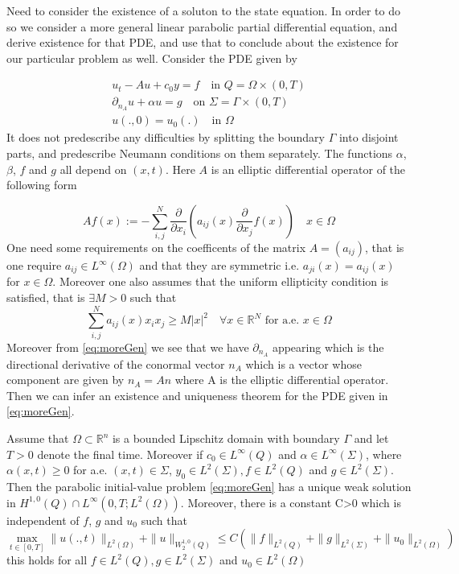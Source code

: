 Need to consider the existence of a soluton to the state equation. In order to do so we consider a more general linear parabolic partial differential equation, and derive existence for that PDE, and use that to conclude about the existence for our particular problem as well. Consider the PDE given by

\begin{align}
    \label{eq:moreGen}
    u_t - Au + c_0 y = f \quad \text{in } Q = \Omega \times (0,T) \\
    \partial_{n_A} u + \alpha u = g \quad \text{on } \Sigma = \Gamma \times (0,T) \\
    u(.,0) = u_0(.) \quad \text{in } \Omega
\end{align}
It does not predescribe any difficulties by splitting the boundary $\Gamma$ into disjoint parts, and predescribe Neumann conditions on them separately. The functions $\alpha$, $\beta$, $f$ and $g$ all depend on $(x,t)$. Here $A$ is an elliptic differential operator of the following form

\begin{equation*}
    Af(x) := -\sum_{i,j}^N\frac{\partial}{\partial x_i}(a_{ij}(x)\frac{\partial}{\partial x_j}f(x)) \quad x\in \Omega
\end{equation*}
One need some requirements on the coefficents of the matrix $A=(a_{ij})$, that is one require $a_{ij} \in L^{\infty}(\Omega)$ and that they are symmetric i.e. $a_{ji}(x) = a_{ij}(x)$ for $x\in \Omega$. Moreover one also assumes that the uniform ellipticity condition is satisfied, that is $\exists M>0$ such that 
\begin{equation*}
    \label{eq:uniformEl}
    \sum_{i,j}^N a_{ij}(x)x_i x_j \geq M|x|^2 \quad \forall x \in \mathbb{R}^N \text{ for a.e. $x\in \Omega$}
\end{equation*}
Moreover from \eqref{eq:moreGen} we see that we have $\partial_{n_A}$ appearing which is the directional derivative of the conormal vector $n_{A}$ which is a vector whose component are given by $n_{A} = An$ where A is the elliptic differential operator. Then we can infer an existence and uniqueness theorem for the PDE given in \eqref{eq:moreGen}. 

\begin{theorem} Assume that $\Omega \subset \mathbb{R}^n$ is a bounded Lipschitz domain with boundary $\Gamma$ and let $T>0$ denote the final time. Moreover if $c_0 \in L^{\infty}(Q)$ and $\alpha \in L^{\infty}(\Sigma)$, where $\alpha(x,t) \geq 0$ for a.e. $(x,t) \in \Sigma$, $y_0 \in L^2(\Sigma), f \in L^2(Q)$ and $g \in L^2(\Sigma)$. Then the parabolic initial-value problem \eqref{eq:moreGen} has a unique weak solution in $H^{1,0}(Q)\cap L^{\infty}(0,T;L^2(\Omega))$. Moreover, there is a constant C>0 which is independent of $f$, $g$ and $u_0$ such that 
\begin{equation*}
    \max_{t \in [0,T]}\|u(.,t)\|_{L^2(\Omega)} + \|u\|_{W_2^{1,0}(Q)} \leq C(\|f\|_{L^2(Q)} + \|g\|_{L^2(\Sigma)} + \|u_0\|_{L^2(\Omega)})
\end{equation*}
this holds for all $f \in L^2(Q), g \in L^2(\Sigma)$ and $u_0 \in L^2(\Omega)$
\end{theorem}

